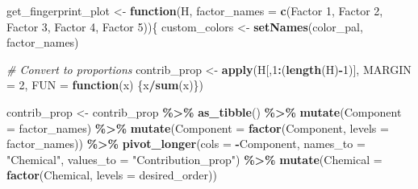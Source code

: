 \documentclass[
]{article}
\newenvironment{Shaded}{\begin{snugshade}}{\end{snugshade}}
\newcommand{\AttributeTok}[1]{\textcolor[rgb]{0.13,0.29,0.53}{#1}}
\newcommand{\CommentTok}[1]{\textcolor[rgb]{0.56,0.35,0.01}{\textit{#1}}}
\newcommand{\ControlFlowTok}[1]{\textcolor[rgb]{0.13,0.29,0.53}{\textbf{#1}}}
\newcommand{\DecValTok}[1]{\textcolor[rgb]{0.00,0.00,0.81}{#1}}
\newcommand{\FunctionTok}[1]{\textcolor[rgb]{0.13,0.29,0.53}{\textbf{#1}}}
\newcommand{\NormalTok}[1]{#1}
\newcommand{\OtherTok}[1]{\textcolor[rgb]{0.56,0.35,0.01}{#1}}
\newcommand{\SpecialCharTok}[1]{\textcolor[rgb]{0.81,0.36,0.00}{\textbf{#1}}}
\newcommand{\StringTok}[1]{\textcolor[rgb]{0.31,0.60,0.02}{#1}}
\begin{document}
\begin{Shaded}
\begin{Highlighting}[]
\NormalTok{get\_fingerprint\_plot }\OtherTok{\textless{}{-}} \ControlFlowTok{function}\NormalTok{(H, }\AttributeTok{factor\_names =} \FunctionTok{c}\NormalTok{(}\StringTok{\textquotesingle{}Factor 1\textquotesingle{}}\NormalTok{, }\StringTok{\textquotesingle{}Factor 2\textquotesingle{}}\NormalTok{,}
                                                     \StringTok{\textquotesingle{}Factor 3\textquotesingle{}}\NormalTok{, }\StringTok{\textquotesingle{}Factor 4\textquotesingle{}}\NormalTok{,}
                                                     \StringTok{\textquotesingle{}Factor 5\textquotesingle{}}\NormalTok{))\{}
\NormalTok{  custom\_colors }\OtherTok{\textless{}{-}} \FunctionTok{setNames}\NormalTok{(color\_pal,}
\NormalTok{                            factor\_names)}

  \CommentTok{\# Convert to proportions}
\NormalTok{  contrib\_prop }\OtherTok{\textless{}{-}} \FunctionTok{apply}\NormalTok{(H[,}\DecValTok{1}\SpecialCharTok{:}\NormalTok{(}\FunctionTok{length}\NormalTok{(H)}\SpecialCharTok{{-}}\DecValTok{1}\NormalTok{)], }\AttributeTok{MARGIN =} \DecValTok{2}\NormalTok{, }
                        \AttributeTok{FUN =} \ControlFlowTok{function}\NormalTok{(x) \{x}\SpecialCharTok{/}\FunctionTok{sum}\NormalTok{(x)\})}
  
\NormalTok{  contrib\_prop }\OtherTok{\textless{}{-}}\NormalTok{ contrib\_prop }\SpecialCharTok{\%\textgreater{}\%}
    \FunctionTok{as\_tibble}\NormalTok{() }\SpecialCharTok{\%\textgreater{}\%}
    \FunctionTok{mutate}\NormalTok{(}\AttributeTok{Component =}\NormalTok{ factor\_names) }\SpecialCharTok{\%\textgreater{}\%}
    \FunctionTok{mutate}\NormalTok{(}\AttributeTok{Component =} \FunctionTok{factor}\NormalTok{(Component, }\AttributeTok{levels =}\NormalTok{ factor\_names)) }\SpecialCharTok{\%\textgreater{}\%}
    \FunctionTok{pivot\_longer}\NormalTok{(}\AttributeTok{cols =} \SpecialCharTok{{-}}\NormalTok{Component,}
                 \AttributeTok{names\_to =} \StringTok{"Chemical"}\NormalTok{,}
                 \AttributeTok{values\_to =} \StringTok{"Contribution\_prop"}\NormalTok{) }\SpecialCharTok{\%\textgreater{}\%}
    \FunctionTok{mutate}\NormalTok{(}\AttributeTok{Chemical =} \FunctionTok{factor}\NormalTok{(Chemical, }\AttributeTok{levels =}\NormalTok{ desired\_order))}
    

\end{Highlighting}
\end{Shaded}
\end{document}
